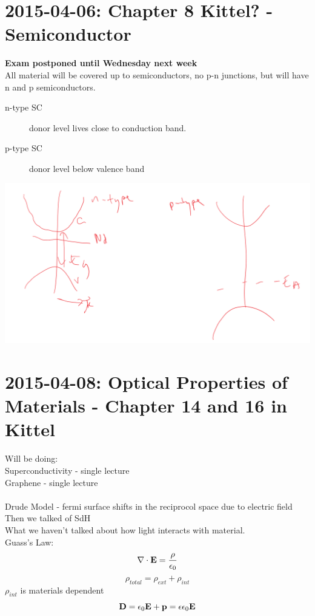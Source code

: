 \documentclass[english, 11pt]{article}
\begin{document}
			
	
	
	\pagebreak
	\section{2015-04-06: Chapter 8 Kittel? - Semiconductor}
		\Large{\textbf{Exam postponed until Wednesday next week}}\\
			All material will be covered up to semiconductors, no p-n junctions, but will have n and p semiconductors.
			
			\begin{description}
				\item[n-type SC] donor level lives close to conduction band.
				\item[p-type SC] donor level below valence band
			\end{description}
			
			 \includegraphics{pntype.png} 
			 
	\pagebreak
	\section{2015-04-08: Optical Properties of Materials -  Chapter 14 and 16 in Kittel}
		Will be doing: \\
		Superconductivity - single lecture \\
		Graphene - single lecture \\
		
		~\\
		Drude Model - fermi surface shifts in the reciprocol space due to electric field\\
		Then we talked of SdH\\
		What we haven't talked about how light interacts with material.
		~\\
		Guass's Law:
		\begin{equation}
			\nabla \cdot \textrm{\textbf{E}} = \frac{\rho}{\epsilon_0}
		\end{equation}
		\begin{equation}
			\rho_{total} = \rho_{ext} + \rho_{int}
		\end{equation}
		$\rho_{int}$ is materials dependent
		\begin{equation}
			\textrm{\textbf{D}} = \epsilon_0 \textrm{\textbf{E}} + \textrm{\textbf{p}} = \epsilon \epsilon_0 \textrm{\textbf{E}}
		\end{equation}
		
\end{document}
